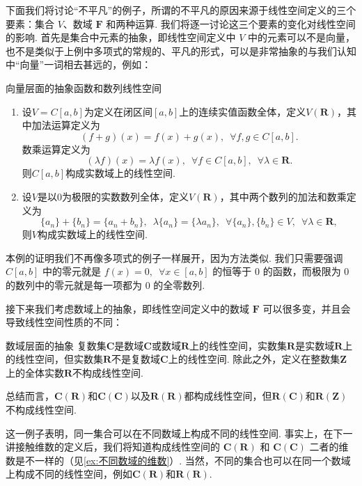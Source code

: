 下面我们将讨论``不平凡''的例子，所谓的不平凡的原因来源于线性空间定义的三个要素：集合 $V$、数域 $\mathbf{F}$ 和两种运算. 我们将逐一讨论这三个要素的变化对线性空间的影响. 首先是集合中元素的抽象，即线性空间定义中 $V$ 中的元素可以不是向量，也不是类似于上例中多项式的常规的、平凡的形式，可以是非常抽象的与我们认知中``向量''一词相去甚远的，例如：
\begin{example}{向量层面的抽象}{函数和数列线性空间}
    \begin{enumerate}
        \item 设$V=C[a,b]$为定义在闭区间$[a,b]$上的连续实值函数全体，定义$V(\mathbf{R})$，其中加法运算定义为
              \[(f+g)(x)=f(x)+g(x),\enspace\forall f,g\in C[a,b].\]
              数乘运算定义为
              \[(\lambda f)(x)=\lambda f(x),\enspace\forall f\in C[a,b],\enspace\forall \lambda\in\mathbf{R}.\]
              则$C[a,b]$构成实数域上的线性空间.

        \item 设$V$是以$0$为极限的实数数列全体，定义$V(\mathbf{R})$，其中两个数列的加法和数乘定义为
              \[\{a_n\}+\{b_n\}=\{a_n+b_n\},\enspace\lambda\{a_n\}=\{\lambda a_n\},\enspace\forall \{a_n\},\{b_n\}\in V,\enspace\forall \lambda\in\mathbf{R},\]
              则$V$构成实数域上的线性空间.
    \end{enumerate}
\end{example}

本例的证明我们不再像多项式的例子一样展开，因为方法类似. 我们只需要强调 $C[a,b]$ 中的零元就是 $f(x) = 0, \enspace \forall x \in [a,b]$ 的恒等于 $0$ 的函数，而极限为 $0$ 的数列中的零元就是每一项都为 $0$ 的全零数列.

接下来我们考虑数域上的抽象，即线性空间定义中的数域 $\mathbf{F}$ 可以很多变，并且会导致线性空间性质的不同：
\begin{example}{数域层面的抽象}{}
    复数集$\mathbf{C}$是数域$\mathbf{C}$或数域$\mathbf{R}$上的线性空间，实数集$\mathbf{R}$是实数域$\mathbf{R}$上的线性空间，但实数集$\mathbf{R}$不是复数域$\mathbf{C}$上的线性空间. 除此之外，定义在整数集$\mathbf{Z}$上的全体实数$\mathbf{R}$不构成线性空间.

    总结而言，$\mathbf{C}(\mathbf{R})$和$\mathbf{C}(\mathbf{C})$以及$\mathbf{R(R)}$都构成线性空间，但$\mathbf{R}(\mathbf{C})$和$\mathbf{R}(\mathbf{Z})$不构成线性空间.
\end{example}

这一例子表明，同一集合可以在不同数域上构成不同的线性空间. 事实上，在下一讲接触维数的定义后，我们将知道构成线性空间的 $\mathbf{C}(\mathbf{R})$ 和 $\mathbf{C}(\mathbf{C})$ 二者的维数是不一样的（见\autoref{ex:不同数域的维数}）. 当然，不同的集合也可以在同一个数域上构成不同的线性空间，例如$\mathbf{C(R)}$和$\mathbf{R(R)}$.

